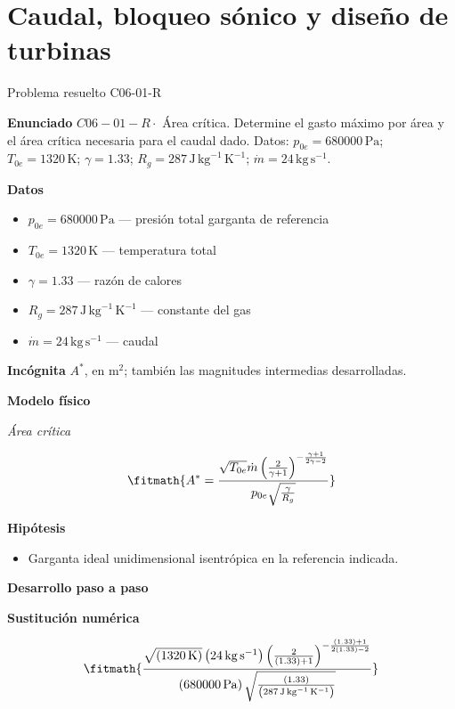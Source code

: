 \documentclass[10pt,openany]{book}
\begin{document}
\chapter{Caudal, bloqueo sónico y diseño de turbinas}
\begin{studiumworked}{Problema resuelto C06-01-R}


\noindent\textbf{Enunciado}
\(C06-01-R \cdot\) Área crítica. Determine el gasto máximo por área y el área crítica necesaria para el caudal dado. Datos: \(p_{0e}=680000\, \mathrm{Pa}\); \(T_{0e}=1320\, \mathrm{K}\); \(\gamma=1.33\); \(R_g=287\, \mathrm{J}\,\mathrm{kg}^{-1}\,\mathrm{K}^{-1}\); \(\dot m=24\, \mathrm{kg}\,\mathrm{s}^{-1}\).

\noindent\textbf{Datos}
\begin{itemize}
\item $p_{0e} = 680000\,\mathrm{Pa}$ — presión total garganta de referencia
\item $T_{0e} = 1320\,\mathrm{K}$ — temperatura total
\item $\gamma = 1.33$ — razón de calores
\item $R_g = 287\,\mathrm{J}\,\mathrm{kg}^{-1}\,\mathrm{K}^{-1}$ — constante del gas
\item $\dot m = 24\,\mathrm{kg}\,\mathrm{s}^{-1}$ — caudal
\end{itemize}

\noindent\textbf{Incógnita}
$A^{*}$, en $\mathrm{m^{2}}$; también las magnitudes intermedias desarrolladas.

\noindent\textbf{Modelo físico}

\noindent\textit{Área crítica}

\[
\fitmath{A^{*}=\frac{\sqrt{T_{0e}} \dot m \left(\frac{2}{\gamma + 1}\right)^{- \frac{\gamma + 1}{2 \gamma - 2}}}{p_{0e} \sqrt{\frac{\gamma}{R_g}}}}
\]

\noindent\textbf{Hipótesis}
\begin{itemize}
\item Garganta ideal unidimensional isentrópica en la referencia indicada.
\end{itemize}

\noindent\textbf{Desarrollo paso a paso}



\noindent\textbf{Sustitución numérica}

\[
\fitmath{\frac{\sqrt{\left(1320\,\mathrm{K}\right)} \left(24\,\mathrm{kg}\,\mathrm{s}^{-1}\right) \left(\frac{2}{\left(1.33\right) + 1}\right)^{- \frac{\left(1.33\right) + 1}{2 \left(1.33\right) - 2}}}{\left(680000\,\mathrm{Pa}\right) \sqrt{\frac{\left(1.33\right)}{\left(287\,\mathrm{J}\,\mathrm{kg}^{-1}\,\mathrm{K}^{-1}\right)}}}}
\]


\end{studiumworked}
\end{document}
